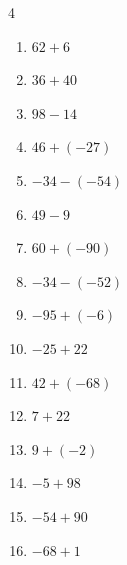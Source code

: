 \begin{multicols}{4}
\begin{enumerate}
  \item $62+6$

        \phantom{$=68$}

  \item $36+40$

        \phantom{$=76$}

  \item $98-14$

        \phantom{$=84$}

  \item $46+(-27)$

        \phantom{$=19$}

  \item $-34-(-54)$

        \phantom{$=20$}

\columnbreak %

  \item $49-9$

        \phantom{$=40$}

  \item $60+(-90)$

        \phantom{$=-30$}

  \item $-34-(-52)$

        \phantom{$=18$}

  \item $-95+(-6)$

        \phantom{$=-101$}

  \item $-25+22$

        \phantom{$=-3$}

  \item $42+(-68)$

        \phantom{$=-26$}

  \item $7+22$

        \phantom{$=29$}

  \item $9+(-2)$

        \phantom{$=7$}

  \item $-5+98$

        \phantom{$=93$}

  \item $-54+90$

        \phantom{$=36$}

  \item $-68+1$


\end{enumerate}
\end{multicols}
